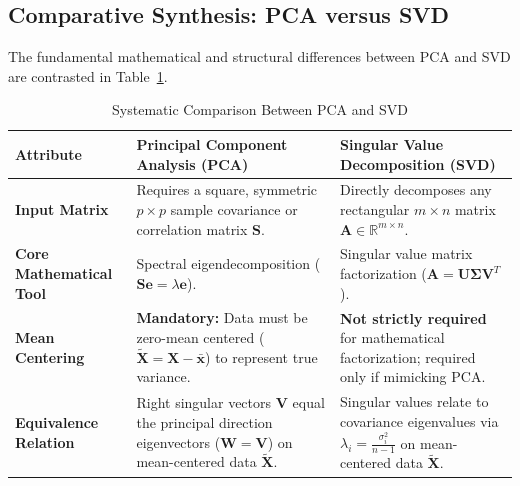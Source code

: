 \subsection{Comparative Synthesis: PCA versus SVD}
The fundamental mathematical and structural differences between PCA and SVD are contrasted in Table~\ref{tab:pca_vs_svd}.

\begin{table}[!htbp]
\centering
\caption{Systematic Comparison Between PCA and SVD}
\label{tab:pca_vs_svd}
\vspace{0.2em}
\renewcommand{\arraystretch}{1.3}
\begin{tabularx}{\textwidth}{>{\bfseries}lXX}
\toprule
Attribute & Principal Component Analysis (PCA) & Singular Value Decomposition (SVD) \\
\midrule
Input Matrix & Requires a square, symmetric $p \times p$ sample covariance or correlation matrix $\mathbf{S}$. & Directly decomposes any rectangular $m \times n$ matrix $\mathbf{A} \in \mathbb{R}^{m \times n}$. \\
Core Mathematical Tool & Spectral eigendecomposition ($\mathbf{S}\mathbf{e} = \lambda \mathbf{e}$). & Singular value matrix factorization ($\mathbf{A} = \mathbf{U} \boldsymbol{\Sigma} \mathbf{V}^T$). \\
Mean Centering & \textbf{Mandatory:} Data must be zero-mean centered ($\tilde{\mathbf{X}} = \mathbf{X} - \bar{\mathbf{x}}$) to represent true variance. & \textbf{Not strictly required} for mathematical factorization; required only if mimicking PCA. \\
Equivalence Relation & Right singular vectors $\mathbf{V}$ equal the principal direction eigenvectors ($\mathbf{W} = \mathbf{V}$) on mean-centered data $\tilde{\mathbf{X}}$. & Singular values relate to covariance eigenvalues via $\lambda_i = \frac{\sigma_i^2}{n - 1}$ on mean-centered data $\tilde{\mathbf{X}}$. \\
\bottomrule
\end{tabularx}
\end{table}
